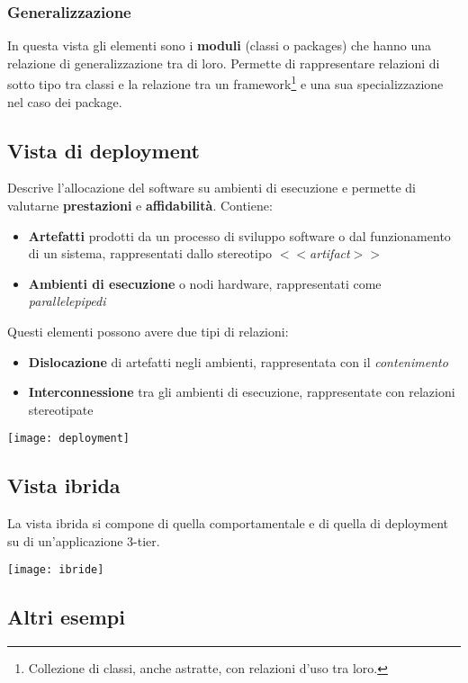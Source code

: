 \subsubsection{Generalizzazione}
In questa vista gli elementi sono i \textbf{moduli} (classi o packages) che hanno una relazione di generalizzazione tra di loro. Permette di rappresentare relazioni di sotto tipo tra classi e la relazione tra un framework\footnote{Collezione di classi, anche astratte, con relazioni d'uso tra loro.} e una sua specializzazione nel caso dei package.

\subsection{Vista di deployment}
Descrive l'allocazione del software su ambienti di esecuzione e permette di valutarne \textbf{prestazioni} e \textbf{affidabilità}. Contiene:
\begin{itemize}
	\item \textbf{Artefatti} prodotti da un processo di sviluppo software o dal funzionamento di un sistema, rappresentati dallo stereotipo \textit{$<<$artifact$>>$}
	\item \textbf{Ambienti di esecuzione} o nodi hardware, rappresentati come \textit{parallelepipedi}
\end{itemize}
Questi elementi possono avere due tipi di relazioni:
\begin{itemize}
	\item \textbf{Dislocazione} di artefatti negli ambienti, rappresentata con il \textit{contenimento}
	\item \textbf{Interconnessione} tra gli ambienti di esecuzione, rappresentate con relazioni stereotipate
\end{itemize}
\begin{center}
	\texttt{[image: deployment]}
\end{center}

\subsection{Vista ibrida}
La vista ibrida si compone di quella comportamentale e di quella di deployment su di un'applicazione 3-tier.
\begin{center}
	\texttt{[image: ibride]}
\end{center}

\subsection{Altri esempi}
